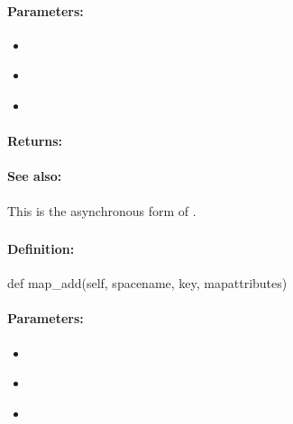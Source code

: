 \paragraph{Parameters:}
\begin{itemize}[noitemsep]
\item {}\\

\item {}\\

\item {}\\

\end{itemize}

\paragraph{Returns:}


\paragraph{See also:}  This is the asynchronous form of .

\pagebreak
\subsubsection{}
\label{api:python:map_add}


\paragraph{Definition:}
\begin{pythoncode}
def map_add(self, spacename, key, mapattributes)
\end{pythoncode}

\paragraph{Parameters:}
\begin{itemize}[noitemsep]
\item {}\\

\item {}\\

\item {}\\

\end{itemize}

